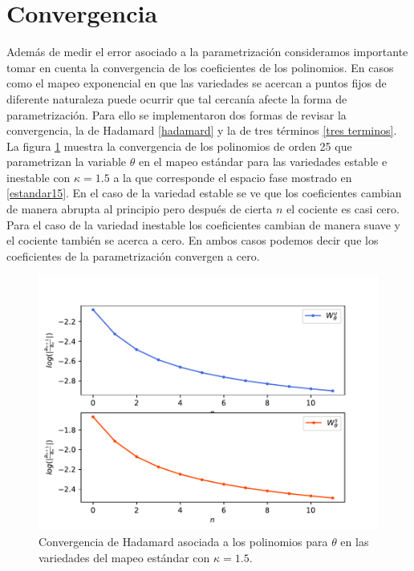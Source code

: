 \section{Convergencia}
Además de medir el error asociado a la parametrización consideramos importante tomar en cuenta la convergencia de los coeficientes de los polinomios. En casos como el mapeo exponencial en que las variedades se acercan a puntos fijos de diferente naturaleza puede ocurrir que tal cercanía afecte la forma de parametrización. Para ello se implementaron dos formas de revisar la convergencia, la de Hadamard \ref{hadamard} y la de tres términos \ref{tres terminos}. \\

La figura \ref{convergenciaEst15} muestra la convergencia de los polinomios de orden 25 que parametrizan la variable $\theta$ en el mapeo estándar para las variedades estable e inestable con $\kappa=1.5$ a la que corresponde el espacio fase mostrado en \ref{estandar15}. En el caso de la variedad estable se ve que los coeficientes cambian de manera abrupta al principio pero después de cierta $n$ el cociente es casi cero. Para el caso de la variedad inestable los coeficientes cambian de manera suave y el cociente también se acerca a cero. En ambos casos podemos decir que los coeficientes de la parametrización convergen a cero.  
\begin{figure}[H]
\centering
\includegraphics[scale=0.5]{converEst15}
\caption{Convergencia de Hadamard asociada a los polinomios para $\theta$ en las variedades del mapeo estándar con $\kappa=1.5$.}
\label{convergenciaEst15}
\end{figure}

